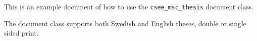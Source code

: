 This is an example document of how to use the
\texttt{csee\_msc\_thesis} document class.

The document class supports both Swedish and English theses, double
or single sided print.
